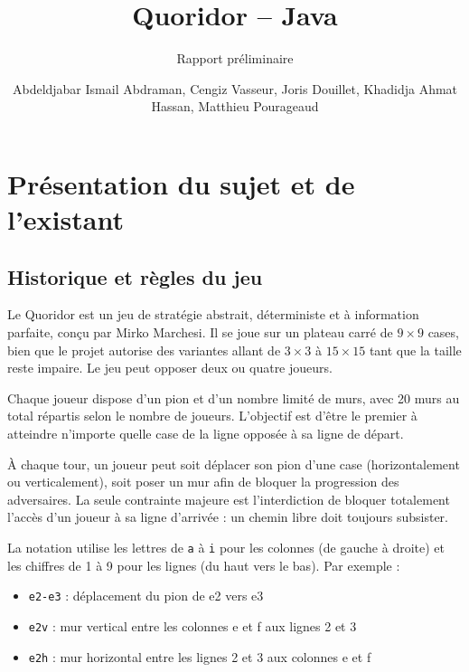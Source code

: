 \documentclass[a4paper]{article}
\title{Quoridor -- Java}
\subtitle{Rapport préliminaire}
\author{Abdeldjabar Ismail Abdraman, Cengiz Vasseur, Joris Douillet, Khadidja Ahmat Hassan, Matthieu Pourageaud}
\begin{document}

\maketitle
\thispagestyle{empty}



\section{Présentation du sujet et de l'existant}

\subsection{Historique et règles du jeu}

Le Quoridor est un jeu de stratégie abstrait, déterministe et à information parfaite,
conçu par Mirko Marchesi. Il se joue sur un plateau carré de $9 \times 9$ cases, bien
que le projet autorise des variantes allant de $3 \times 3$ à $15 \times 15$ tant que
la taille reste impaire. Le jeu peut opposer deux ou quatre joueurs.

Chaque joueur dispose d'un pion et d'un nombre limité de murs, avec 20 murs au total
répartis selon le nombre de joueurs. L'objectif est d'être le premier à atteindre
n'importe quelle case de la ligne opposée à sa ligne de départ.

À chaque tour, un joueur peut soit déplacer son pion d'une case (horizontalement ou
verticalement), soit poser un mur afin de bloquer la progression des adversaires.
La seule contrainte majeure est l'interdiction de bloquer totalement l'accès d'un
joueur à sa ligne d'arrivée : un chemin libre doit toujours subsister.

La notation utilise les lettres de \texttt{a} à \texttt{i} pour les colonnes (de gauche
à droite) et les chiffres de 1 à 9 pour les lignes (du haut vers le bas).
Par exemple :
\begin{itemize}
    \item \texttt{e2-e3} : déplacement du pion de e2 vers e3
    \item \texttt{e2v} : mur vertical entre les colonnes e et f aux lignes 2 et 3
    \item \texttt{e2h} : mur horizontal entre les lignes 2 et 3 aux colonnes e et f
\end{itemize}
\end{document}
